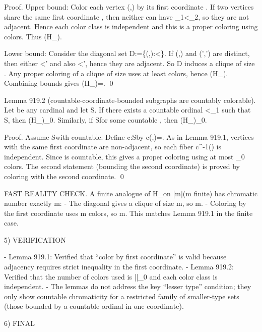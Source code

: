 Proof.
Upper bound: Color each vertex (\alpha,\beta) by its first coordinate \alpha.
If two vertices share the same first coordinate \alpha, then neither can have \alpha_1<\alpha_2, so they are not adjacent.
Hence each color class is independent and this is a proper coloring using \kappa colors.
Thus \chi(H_\kappa)\le \kappa.

Lower bound: Consider the diagonal set D:=\{(\alpha,\alpha):\alpha<\kappa\}.
If (\alpha,\alpha) and (\alpha',\alpha') are distinct, then either \alpha<\alpha' and also \alpha<\alpha', hence they are adjacent.
So D induces a clique of size \kappa.
Any proper coloring of a clique of size \kappa uses at least \kappa colors, hence \chi(H_\kappa)\ge \kappa.
Combining bounds gives \chi(H_\kappa)=\kappa. \qed

Lemma 919.2 (countable-coordinate-bounded subgraphs are countably colorable).
Let \kappa be any cardinal and let S\subseteq \kappa\times\kappa.
If there exists a countable ordinal \gamma<\omega_1 such that S\subseteq \gamma\times\kappa, then \chi(H_\kappa[S])\le \aleph_0.
Similarly, if S\subseteq \kappa\times\gamma for some countable \gamma, then \chi(H_\kappa[S])\le \aleph_0.

Proof.
Assume S\subseteq \gamma\times\kappa with \gamma countable.
Define c:S\to\gamma by c(\alpha,\beta)=\alpha.
As in Lemma 919.1, vertices with the same first coordinate are non-adjacent, so each fiber c^{-1}(\alpha) is independent.
Since \gamma is countable, this gives a proper coloring using at most \aleph_0 colors.
The second statement (bounding the second coordinate) is proved by coloring with the second coordinate. \qed

FAST REALITY CHECK.
A finite analogue of H_\kappa on [m]\times[m] (m finite) has chromatic number exactly m:
- The diagonal gives a clique of size m, so \chi\ge m.
- Coloring by the first coordinate uses m colors, so \chi\le m.
This matches Lemma 919.1 in the finite case.


5) VERIFICATION

- Lemma 919.1: Verified that “color by first coordinate” is valid because adjacency requires strict inequality in the first coordinate.
- Lemma 919.2: Verified that the number of colors used is |\gamma|\le\aleph_0 and each color class is independent.
- The lemmas do not address the key “lesser type” condition; they only show countable chromaticity for a restricted family of smaller-type sets (those bounded by a countable ordinal in one coordinate).


6) FINAL

